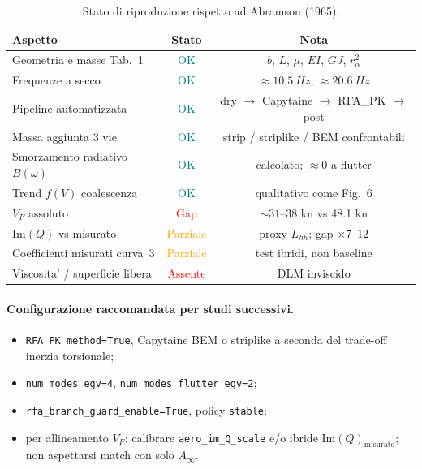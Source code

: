 \documentclass[11pt,a4paper]{article}
\begin{document}
\begin{table}[H]
  \centering
  \caption{Stato di riproduzione rispetto ad Abramson (1965).}
  \label{tab:reproduction-status}
  \begin{tabular}{p{4.2cm}cc}
    \toprule
    Aspetto & Stato & Nota \\
    \midrule
    Geometria e masse Tab.~1 & \textcolor{teal}{OK} & $b$, $L$, $\mu$, $EI$, $GJ$, $r_\alpha^2$ \\
    Frequenze a secco & \textcolor{teal}{OK} & $\approx\SI{10.5}{Hz}$, $\approx\SI{20.6}{Hz}$ \\
    Pipeline automatizzata & \textcolor{teal}{OK} & dry $\to$ Capytaine $\to$ RFA\_PK $\to$ post \\
    Massa aggiunta 3 vie & \textcolor{teal}{OK} & strip / striplike / BEM confrontabili \\
    Smorzamento radiativo $B(\omega)$ & \textcolor{teal}{OK} & calcolato; $\approx 0$ a flutter \\
    Trend $f(V)$ coalescenza & \textcolor{teal}{OK} & qualitativo come Fig.~6 \\
    $V_F$ assoluto & \textcolor{red}{Gap} & $\sim 31$--$38$ kn vs 48.1 kn \\
    $\mathrm{Im}(Q)$ vs misurato & \textcolor{orange}{Parziale} & proxy $L_{hh}$; gap $\times 7$--$12$ \\
    Coefficienti misurati curva~3 & \textcolor{orange}{Parziale} & test ibridi, non baseline \\
    Viscosita' / superficie libera & \textcolor{red}{Assente} & DLM inviscido \\
    \bottomrule
  \end{tabular}
\end{table}

\paragraph{Configurazione raccomandata per studi successivi.}
\begin{itemize}[nosep]
  \item \texttt{RFA\_PK\_method=True}, Capytaine BEM o striplike a seconda del trade-off
        inerzia torsionale;
  \item \texttt{num\_modes\_egv=4}, \texttt{num\_modes\_flutter\_egv=2};
  \item \texttt{rfa\_branch\_guard\_enable=True}, policy \texttt{stable};
  \item per allineamento $V_F$: calibrare \texttt{aero\_im\_Q\_scale} e/o ibride
        $\mathrm{Im}(Q)_\mathrm{misurato}$; non aspettarsi match con solo $A_\infty$.
\end{itemize}
\end{document}
